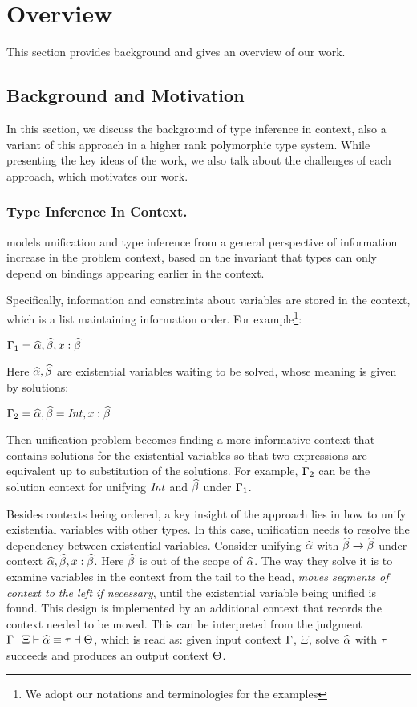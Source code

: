 \section{Overview}
\label{sec:overview}

This section provides background and gives an overview of our work.

\subsection{Background and Motivation}

In this section, we discuss the background of type inference in context, also a
variant of this approach in a higher rank polymorphic type system. While
presenting the key ideas of the work, we also talk about the challenges of each
approach, which motivates our work.

\subsubsection{Type Inference In Context.}

\citet{gundry2010type} models unification and type inference from a general
perspective of information increase in the problem context, based on the
invariant that types can only depend on bindings appearing earlier in the
context.

Specifically, information and constraints about variables are stored in the
context, which is a list maintaining information order. For example\footnote{We
  adopt our notations and terminologies for the examples}:

$\Gamma_1 = \widehat{\alpha}, \widehat{\beta}, x :\widehat{\beta}$

Here $\widehat{\alpha}, \widehat{\beta}$ are existential variables waiting to be solved, whose
meaning is given by solutions:

$\Gamma_2 = \widehat{\alpha}, \widehat{\beta} = \mathit{Int}, x :\widehat{\beta}$

Then unification problem becomes finding a more informative context that
contains solutions for the existential variables so that two expressions are
equivalent up to substitution of the solutions. For
example, $\Gamma_2$ can be the solution context for unifying
$\mathit{Int}$ and $\widehat{\beta}$ under $\Gamma_1$.

Besides contexts being ordered, a key insight of the approach lies in how to
unify existential variables with other types. In this case, unification needs to
resolve the dependency between existential variables. Consider unifying $\widehat{\alpha}$
with $\widehat{\beta} \to \widehat{\beta}$ under context $\widehat{\alpha}, \widehat{\beta}, x : \widehat{\beta}$. Here $\widehat{\beta}$ is
out of the scope of $\widehat{\alpha}$. The way they solve it is to examine variables in
the context from the tail to the head, \textit{moves segments of context to the
  left if necessary}, until the existential variable being unified is found.
This design is implemented by an additional context that records the context
needed to be moved. This can be interpreted from the judgment $\Gamma \shortmid
\Xi \vdash \widehat{\alpha} \equiv \tau \dashv \Theta$, which is read as: given input context
$\Gamma$, $\Xi$, solve $\widehat{\alpha}$ with $\tau$ succeeds and produces an output
context $\Theta$.

